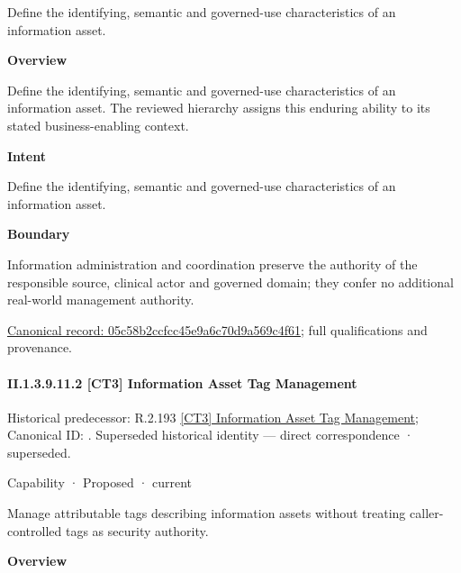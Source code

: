 Define the identifying, semantic and governed-use characteristics of an information asset.



\textbf{Overview}



Define the identifying, semantic and governed-use characteristics of an information asset. The reviewed hierarchy assigns this enduring ability to its stated business-enabling context.



\textbf{Intent}



Define the identifying, semantic and governed-use characteristics of an information asset.



\textbf{Boundary}



Information administration and coordination preserve the authority of the responsible source, clinical actor and governed domain; they confer no additional real-world management authority.


{\footnotesize \href{../../../../../../../continuum/strategy/capability/05c58b2ccfcc45e9a6c70d9a569c4f61.md}{Canonical record: 05c58b2ccfcc45e9a6c70d9a569c4f61}; full qualifications and provenance.}\par
\paragraph*{II.1.3.9.11.2 [CT3] Information Asset Tag Management}
\label{navigation:II.1.3.9.11.2}

{\small Historical predecessor: R.2.193 \hyperref[element:ae44a4ee78414d1098814315793bd751]{[CT3] Information Asset Tag Management}; Canonical ID: \texttt{}. Superseded historical identity — direct correspondence · superseded.}\par
\label{element:df27c3ba6e164e56af7bff4e1eb1954a}
{\small Capability · Proposed · current}\par

Manage attributable tags describing information assets without treating caller-controlled tags as security authority.



\textbf{Overview}



